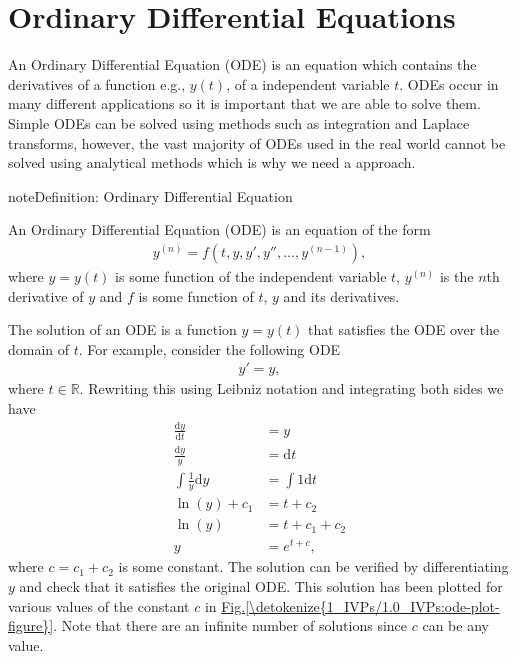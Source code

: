 \documentclass[letterpaper,10pt,english]{jupyterBook}
\begin{document}
\section{Ordinary Differential Equations}
\label{\detokenize{1_IVPs/1.0_IVPs:ordinary-differential-equations}}\label{\detokenize{1_IVPs/1.0_IVPs:ode-section}}
\sphinxAtStartPar
An Ordinary Differential Equation (ODE) is an equation which contains the derivatives of a function e.g., \(y(t)\), of a  independent variable \(t\). ODEs occur in many different applications so it is important that we are able to solve them. Simple ODEs can be solved using  methods such as integration and Laplace transforms, however, the vast majority of ODEs used in the real world cannot be solved using analytical methods which is why we need a  approach.

\begin{sphinxadmonition}{note}{Definition: Ordinary Differential Equation}

\sphinxAtStartPar
An Ordinary Differential Equation (ODE) is an equation of the form
\begin{equation*}
\begin{split}y^{(n)} = f(t, y, y', y'', \ldots, y^{(n-1)}),\end{split}
\end{equation*}
\sphinxAtStartPar
where \(y = y(t)\) is some function of the independent variable \(t\), \(y^{(n)}\) is the \(n\)th derivative of \(y\) and \(f\) is some function of \(t\), \(y\) and its derivatives.
\end{sphinxadmonition}

\sphinxAtStartPar
The solution of an ODE is a function \(y = y(t)\) that satisfies the ODE over the domain of \(t\). For example, consider the following ODE
\begin{equation}\label{equation:1_IVPs/1.0_IVPs:simple-ode}
\begin{split} y' = y,\end{split}
\end{equation}
\sphinxAtStartPar
where \(t \in \mathbb{R}\). Rewriting this using Leibniz notation and integrating both sides we have
\begin{align*}
    \frac{\mathrm{d} y}{\mathrm{d} t} & = y \\
    \frac{\mathrm{d} y}{y} &= \mathrm{d} t \\
    \int \frac{1}{y} \mathrm{d} y &= \int 1 \mathrm{d} t \\
    \ln (y) + c_1 &= t + c_2 \\
    \ln (y) &= t + c_1 + c_2 \\
    y &= e^{t + c},
\end{align*}
\sphinxAtStartPar
where \(c = c_1 + c_2\) is some constant. The solution can be verified by differentiating \(y\) and check that it satisfies the original ODE. This solution has been plotted for various values of the constant \(c\) in \hyperref[\detokenize{1_IVPs/1.0_IVPs:ode-plot-figure}]{Fig.\@ \ref{\detokenize{1_IVPs/1.0_IVPs:ode-plot-figure}}}. Note that there are an infinite number of solutions since \(c\) can be any value.
\end{document}
